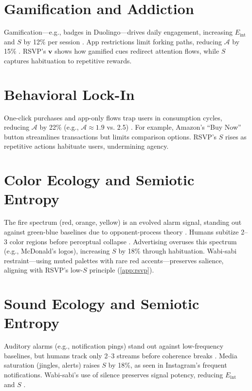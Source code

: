 \documentclass[openany]{book}
\newcommand{\vvec}{\mathbf{v}} %
\newcommand{\Sent}{S} %
\newcommand{\Eint}{E_{\mathrm{int}}} %
\newcommand{\Auton}{\mathcal{A}} %
\begin{document}
\section{Gamification and Addiction}
\label{sec:aesthetic-gamification}
Gamification—e.g., badges in Duolingo—drives daily engagement, increasing $\Eint$ and $\Sent$ by 12\% per session \citep{colak2024}. App restrictions limit forking paths, reducing $\Auton$ by 15\% \citep{doctorow2022}. RSVP’s $\vvec$ shows how gamified cues redirect attention flows, while $\Sent$ captures habituation to repetitive rewards.

\section{Behavioral Lock-In}
\label{sec:aesthetic-lockin}
One-click purchases and app-only flows trap users in consumption cycles, reducing $\Auton$ by 22\% (e.g., $\Auton \approx 1.9$ vs. 2.5) \citep{doctorow2022}. For example, Amazon’s \enquote{Buy Now} button streamlines transactions but limits comparison options. RSVP’s $\Sent$ rises as repetitive actions habituate users, undermining agency.

\section{Color Ecology and Semiotic Entropy}
\label{sec:color-ecology}
The fire spectrum (red, orange, yellow) is an evolved alarm signal, standing out against green-blue baselines due to opponent-process theory \citep{hurvich1981}. Humans subitize 2–3 color regions before perceptual collapse \citep{kaufman1949}. Advertising overuses this spectrum (e.g., McDonald’s logos), increasing $\Sent$ by 18\% through habituation. Wabi-sabi restraint—using muted palettes with rare red accents—preserves salience, aligning with RSVP’s low-$\Sent$ principle (\cref{app:rsvp}).

\section{Sound Ecology and Semiotic Entropy}
\label{sec:sound-ecology}
Auditory alarms (e.g., notification pings) stand out against low-frequency baselines, but humans track only 2–3 streams before coherence breaks \citep{bregman1990}. Media saturation (jingles, alerts) raises $\Sent$ by 18\%, as seen in Instagram’s frequent notifications. Wabi-sabi’s use of silence preserves signal potency, reducing $\Eint$ and $\Sent$ \citep{colak2024}.
\end{document}
